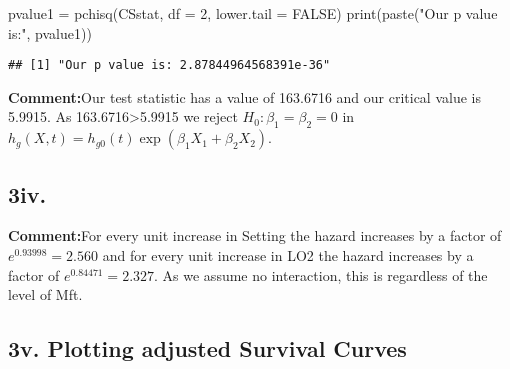\documentclass[
]{article}
\newenvironment{Shaded}{\begin{snugshade}}{\end{snugshade}}
\newcommand{\AttributeTok}[1]{\textcolor[rgb]{0.77,0.63,0.00}{#1}}
\newcommand{\ConstantTok}[1]{\textcolor[rgb]{0.00,0.00,0.00}{#1}}
\newcommand{\DecValTok}[1]{\textcolor[rgb]{0.00,0.00,0.81}{#1}}
\newcommand{\FunctionTok}[1]{\textcolor[rgb]{0.00,0.00,0.00}{#1}}
\newcommand{\NormalTok}[1]{#1}
\newcommand{\OtherTok}[1]{\textcolor[rgb]{0.56,0.35,0.01}{#1}}
\newcommand{\StringTok}[1]{\textcolor[rgb]{0.31,0.60,0.02}{#1}}
\begin{document}
\begin{Shaded}
\begin{Highlighting}[]
\NormalTok{pvalue1 }\OtherTok{=} \FunctionTok{pchisq}\NormalTok{(CSstat, }\AttributeTok{df =} \DecValTok{2}\NormalTok{, }\AttributeTok{lower.tail =} \ConstantTok{FALSE}\NormalTok{)}
\FunctionTok{print}\NormalTok{(}\FunctionTok{paste}\NormalTok{(}\StringTok{"Our p value is:"}\NormalTok{, pvalue1))}
\end{Highlighting}
\end{Shaded}

\begin{verbatim}
## [1] "Our p value is: 2.87844964568391e-36"
\end{verbatim}

\textbf{Comment:}Our test statistic has a value of 163.6716 and our
critical value is 5.9915. As 163.6716\textgreater5.9915 we reject
\(H_0: \beta_1=\beta_2=0\) in
\(h_g(X,t)=h_{g0}(t)\exp(\beta_1 X_1+ \beta_2 X_2)\).

\hypertarget{iv.}{%
\subsection{3iv.}\label{iv.}}

\textbf{Comment:}For every unit increase in Setting the hazard increases
by a factor of \(e^{0.93998}=2.560\) and for every unit increase in LO2
the hazard increases by a factor of \(e^{0.84471}=2.327\). As we assume
no interaction, this is regardless of the level of Mft.

\hypertarget{v.-plotting-adjusted-survival-curves}{%
\subsection{3v. Plotting adjusted Survival
Curves}\label{v.-plotting-adjusted-survival-curves}}
\end{document}
